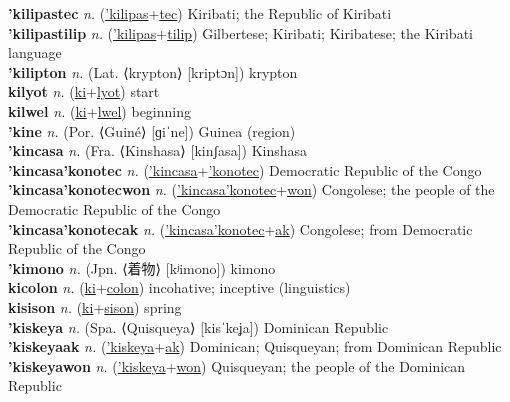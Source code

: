 \textbf{'kilipastec} \textit{n.} (\hyperref['kilipas]{'kilipas}+\hyperref[tec]{tec})
Kiribati; the Republic of Kiribati \label{'kilipastec} \\
\textbf{'kilipastilip} \textit{n.} (\hyperref['kilipas]{'kilipas}+\hyperref[tilip]{tilip})
Gilbertese; Kiribati; Kiribatese; the Kiribati language \label{'kilipastilip} \\
\textbf{'kilipton} \textit{n.} (Lat. ⟨krypton⟩ [kriptɔn])
krypton \label{'kilipton} \\
\textbf{kilyot} \textit{n.} (\hyperref[ki]{ki}+\hyperref[lyot]{lyot})
start \label{kilyot} \\
\textbf{kilwel} \textit{n.} (\hyperref[ki]{ki}+\hyperref[lwel]{lwel})
beginning \label{kilwel} \\
\textbf{'kine} \textit{n.} (Por. ⟨Guiné⟩ [ɡiˈne])
Guinea (region) \label{'kine} \\
\textbf{'kincasa} \textit{n.} (Fra. ⟨Kinshasa⟩ [kinʃasa])
Kinshasa \label{'kincasa} \\
\textbf{'kincasa'konotec} \textit{n.} (\hyperref['kincasa]{'kincasa}+\hyperref['konotec]{'konotec})
Democratic Republic of the Congo \label{'kincasa'konotec} \\
\textbf{'kincasa'konotecwon} \textit{n.} (\hyperref['kincasa'konotec]{'kincasa'konotec}+\hyperref[won]{won})
Congolese; the people of the Democratic Republic of the Congo \label{'kincasa'konotecwon} \\
\textbf{'kincasa'konotecak} \textit{n.} (\hyperref['kincasa'konotec]{'kincasa'konotec}+\hyperref[ak]{ak})
Congolese; from Democratic Republic of the Congo \label{'kincasa'konotecak} \\
\textbf{'kimono} \textit{n.} (Jpn. ⟨着物⟩ [kʲimono])
kimono \label{'kimono} \\
\textbf{kicolon} \textit{n.} (\hyperref[ki]{ki}+\hyperref[colon]{colon})
incohative; inceptive (linguistics) \label{kicolon} \\
\textbf{kisison} \textit{n.} (\hyperref[ki]{ki}+\hyperref[sison]{sison})
spring \label{kisison} \\
\textbf{'kiskeya} \textit{n.} (Spa. ⟨Quisqueya⟩ [kisˈkeʝa])
Dominican Republic \label{'kiskeya} \\
\textbf{'kiskeyaak} \textit{n.} (\hyperref['kiskeya]{'kiskeya}+\hyperref[ak]{ak})
Dominican; Quisqueyan; from Dominican Republic \label{'kiskeyaak} \\
\textbf{'kiskeyawon} \textit{n.} (\hyperref['kiskeya]{'kiskeya}+\hyperref[won]{won})
Quisqueyan; the people of the Dominican Republic \label{'kiskeyawon} \\
